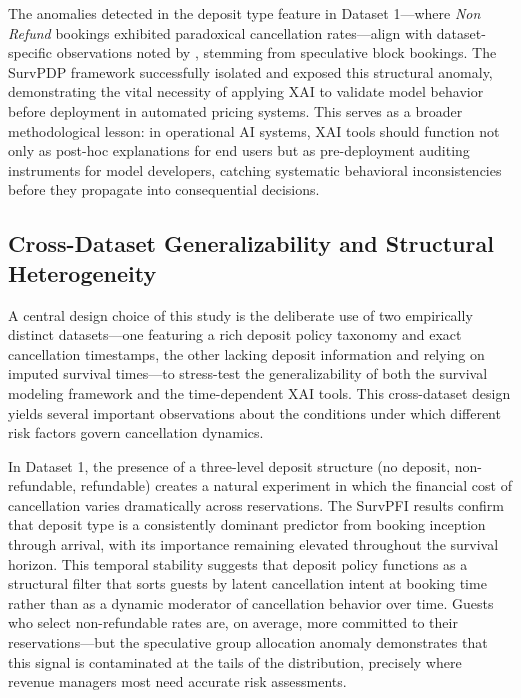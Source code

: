\documentclass[pdflatex,sn-mathphys-ay]{sn-jnl}
\theoremstyle{thmstyleone}%
\theoremstyle{thmstyletwo}%
\theoremstyle{thmstylethree}%
\begin{document}
The anomalies detected in the deposit type feature in Dataset 1—where \textit{Non Refund} bookings exhibited paradoxical cancellation rates—align with dataset-specific observations noted by \cite{antonio2019big}, stemming from speculative block bookings. The SurvPDP framework successfully isolated and exposed this structural anomaly, demonstrating the vital necessity of applying XAI to validate model behavior before deployment in automated pricing systems. This serves as a broader methodological lesson: in operational AI systems, XAI tools should function not only as post-hoc explanations for end users but as pre-deployment auditing instruments for model developers, catching systematic behavioral inconsistencies before they propagate into consequential decisions.

\subsection{Cross-Dataset Generalizability and Structural Heterogeneity}

A central design choice of this study is the deliberate use of two empirically distinct datasets—one featuring a rich deposit policy taxonomy and exact cancellation timestamps, the other lacking deposit information and relying on imputed survival times—to stress-test the generalizability of both the survival modeling framework and the time-dependent XAI tools. This cross-dataset design yields several important observations about the conditions under which different risk factors govern cancellation dynamics.

In Dataset 1, the presence of a three-level deposit structure (no deposit, non-refundable, refundable) creates a natural experiment in which the financial cost of cancellation varies dramatically across reservations. The SurvPFI results confirm that deposit type is a consistently dominant predictor from booking inception through arrival, with its importance remaining elevated throughout the survival horizon. This temporal stability suggests that deposit policy functions as a structural filter that sorts guests by latent cancellation intent at booking time rather than as a dynamic moderator of cancellation behavior over time. Guests who select non-refundable rates are, on average, more committed to their reservations—but the speculative group allocation anomaly demonstrates that this signal is contaminated at the tails of the distribution, precisely where revenue managers most need accurate risk assessments.
\end{document}
